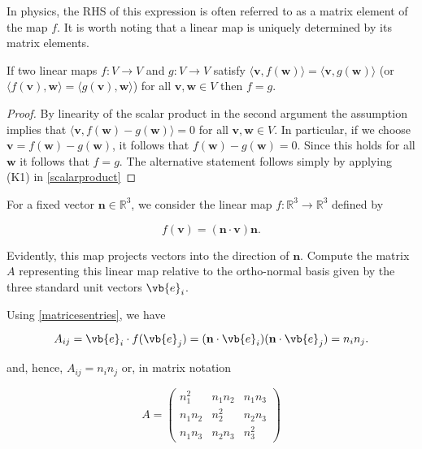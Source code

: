 \documentclass[a4paper,12pt]{report}
\begin{document}
In physics, the RHS of this expression is often referred to as a matrix element of the map \( f \). It is worth noting that a linear map is uniquely determined by its matrix elements.

\begin{lemma} \label{uniquelinearmap} 
If two linear maps \( f : V \rightarrow V \) and \( g : V \rightarrow V \) satisfy \( \langle \mathbf{v}, f(\mathbf{w}) \rangle = \langle \mathbf{v}, g(\mathbf{w}) \rangle \) (or \( \langle f(\mathbf{v}), \mathbf{w} \rangle = \langle g(\mathbf{v}), \mathbf{w} \rangle \)) for all \( \mathbf{v}, \mathbf{w} \in V \) then \( f = g \).
\end{lemma}

\begin{proof}
By linearity of the scalar product in the second argument the assumption implies that \( \langle \mathbf{v}, f(\mathbf{w}) - g(\mathbf{w}) \rangle = 0 \) for all \( \mathbf{v}, \mathbf{w} \in V \). In particular, if we choose \( \mathbf{v} = f(\mathbf{w}) - g(\mathbf{w}) \), it follows that \( f(\mathbf{w}) - g(\mathbf{w}) = 0 \). Since this holds for all \( \mathbf{w} \) it follows that \( f = g \). The alternative statement follows simply by applying (K1) in \cref{scalarproduct}
\end{proof}

{For a fixed vector \(\mathbf{n} \in \mathbb{R}^3\), we consider the linear map \(f : \mathbb{R}^3 \to \mathbb{R}^3\) defined by

\begin{equation}
f(\mathbf{v}) = (\mathbf{n} \cdot \mathbf{v}) \mathbf{n}.
\end{equation}

Evidently, this map projects vectors into the direction of \(\mathbf{n}\). Compute the matrix \(A\) representing this linear map relative to the ortho-normal basis given by the three standard unit vectors \(\vb{e}_i\).
}
{Using \cref{matricesentries}, we have

\begin{equation}
    A_{ij} = \vb{e}_i \cdot f(\vb{e}_j) = (\mathbf{n} \cdot \vb{e}_i)(\mathbf{n} \cdot \vb{e}_j) = n_i n_j.
\end{equation}
    
and, hence, \(A_{ij} = n_i n_j\) or, in matrix notation
    
\begin{equation}
A = \begin{pmatrix}
n_1^2 & n_1 n_2 & n_1 n_3 \\
n_1 n_2 & n_2^2 & n_2 n_3 \\
n_1 n_3 & n_2 n_3 & n_3^2
\end{pmatrix}
\end{equation}} 
\end{document}
